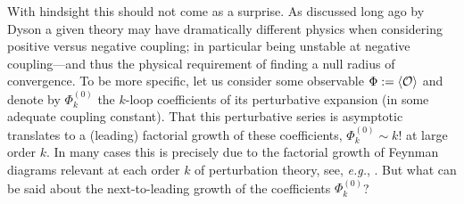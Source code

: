 \documentclass[11pt,a4paper]{article}
\newcommand{\CO}{{\cal O}}
\begin{document}
With hindsight this should not come as a surprise. As discussed long ago by Dyson \cite{d52} a given theory may have dramatically different physics when considering positive versus negative coupling; in particular being unstable at negative coupling---and thus the physical requirement of finding a null radius of convergence. To be more specific, let us consider some observable $\Phi := \langle \CO \rangle$ and denote by $\Phi^{(0)}_{k}$ the $k$-loop coefficients of its perturbative expansion (in some adequate coupling constant). That this perturbative series is asymptotic translates to a (leading) factorial growth of these coefficients, $\Phi^{(0)}_{k} \sim k!$ at large order $k$. In many cases this is precisely due to the factorial growth of Feynman diagrams relevant at each order $k$ of perturbation theory, see, \textit{e.g.}, \cite{z81b, lz90}. But what can be said about the next-to-leading growth of the coefficients $\Phi^{(0)}_{k}$?
\end{document}
